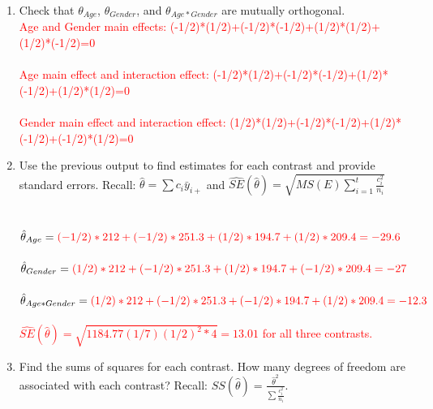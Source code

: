\begin{enumerate}
\item Check that $\theta_{Age}$, $\theta_{Gender}$, and $\theta_{Age*Gender}$ are mutually orthogonal.  %
\textcolor{red}{\\
Age and Gender main effects: (-1/2)*(1/2)+(-1/2)*(-1/2)+(1/2)*(1/2)+(1/2)*(-1/2)=0\\~\\
Age main effect and interaction effect: (-1/2)*(1/2)+(-1/2)*(-1/2)+(1/2)*(-1/2)+(1/2)*(1/2)=0\\~\\
Gender main effect and interaction effect: (1/2)*(1/2)+(-1/2)*(-1/2)+(1/2)*(-1/2)+(-1/2)*(1/2)=0}
\item Use the previous output to find estimates for each contrast and provide standard errors.  Recall: $\hat\theta=\sum c_i \bar{y}_{i+}$ and $\hat{SE}(\hat{\theta})=\sqrt{MS(E)\sum_{i=1}^{t}\frac{c_i^2}{n_i}}$\\~\\~\\
$\hat{\theta}_{Age} = \textcolor{red}{(-1/2)*212+(-1/2)*251.3+(1/2)*194.7+(1/2)*209.4=-29.6}$\\~\\
$\hat{\theta}_{Gender} = \textcolor{red}{(1/2)*212+(-1/2)*251.3+(1/2)*194.7+(-1/2)*209.4=-27}$\\~\\
$\hat{\theta}_{Age*Gender} = \textcolor{red}{(1/2)*212+(-1/2)*251.3+(-1/2)*194.7+(1/2)*209.4=-12.3}$\\~\\
\textcolor{red}{$\hat{SE}(\hat{\theta})=\sqrt{1184.77(1/7)(1/2)^2*4}=13.01$ for all three contrasts.}
\item Find the sums of squares for each contrast.  How many degrees of freedom are associated with each contrast?   Recall: $ SS(\hat\theta) = \frac{\hat\theta^2}{\sum \frac{c_i^2}{n_i}}.$\\~\\~\\

\end{enumerate}
